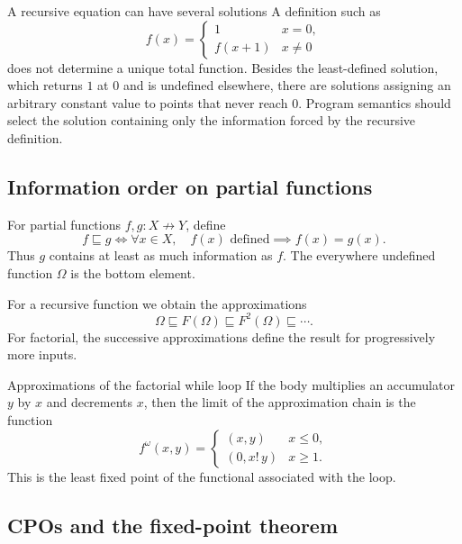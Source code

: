 \documentclass[a4paper]{article}
\begin{document}
\begin{snippetexample}{A recursive equation can have several solutions}
    A definition such as
    \[
        f(x)=
        \begin{cases}
            1 & x=0,\\
            f(x+1) & x\neq0
        \end{cases}
    \]
    does not determine a unique total function.
    Besides the least-defined solution, which returns \(1\) at \(0\) and is undefined elsewhere, there are solutions assigning an arbitrary constant value to points that never reach \(0\).
    Program semantics should select the solution containing only the information forced by the recursive definition.
\end{snippetexample}

\subsection{Information order on partial functions}

For partial functions \(f,g\colon X\not\to Y\), define
\[
    f\sqsubseteq g
    \iff
    \forall x\in X,
    \quad
    f(x)\text{ defined}
    \implies
    f(x)=g(x).
\]
Thus \(g\) contains at least as much information as \(f\).
The everywhere undefined function \(\Omega\) is the bottom element.

For a recursive function we obtain the approximations
\[
    \Omega
    \sqsubseteq
    F(\Omega)
    \sqsubseteq
    F^2(\Omega)
    \sqsubseteq
    \cdots.
\]
For factorial, the successive approximations define the result for progressively more inputs.

\begin{snippetexample}{Approximations of the factorial while loop}
    If the body multiplies an accumulator \(y\) by \(x\) and decrements \(x\), then the limit of the approximation chain is the function
    \[
        f^\omega(x,y)
        =
        \begin{cases}
            (x,y) & x\leq0,\\
            (0,x!\,y) & x\geq1.
        \end{cases}
    \]
    This is the least fixed point of the functional associated with the loop.
\end{snippetexample}

\subsection{CPOs and the fixed-point theorem}
\end{document}
